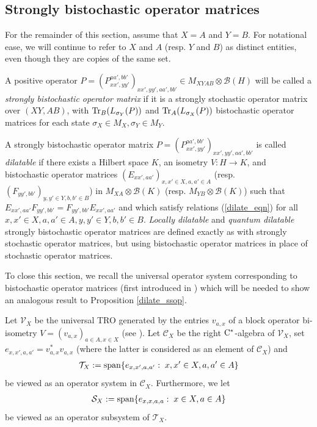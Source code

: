 \documentclass[11pt]{amsart}
\newcommand{\cl}[1]{\mathcal{#1}}
\begin{document}
\subsection{Strongly bistochastic operator matrices}

For the remainder of this section, assume that $X = A$ and $Y = B$. For notational ease, we will continue to refer to $X$ and $A$ (resp. $Y$ and $B$) as distinct entities, even though they are copies of the same set. 

A positive operator $P = (P_{xx', yy'}^{aa', bb'})_{xx', yy', aa', bb'} \in M_{XYAB}\otimes \cl{B}(H)$ will be called a \textit{strongly bistochastic operator matrix} if it is a strongly stochastic operator matrix over $(XY, AB)$, with ${\rm Tr}_{B}(L_{\sigma_{Y}}(P))$ and ${\rm Tr}_{A}(L_{\sigma_{X}}(P))$ bistochastic operator matrices for each state $\sigma_{X} \in M_{X}, \sigma_{Y} \in M_{Y}$. 

A strongly bistochastic operator matrix $P = (P_{xx', yy'}^{aa', bb'})_{xx', yy', aa', bb'}$ is called \textit{dilatable} if there exists a Hilbert space $K$, an isometry $V: H\rightarrow K$, and bistochastic operator matrices $(E_{xx', aa'})_{x, x' \in X, a, a' \in A}$ (resp. $(F_{yy', bb'})_{y, y' \in Y, b, b' \in B}$) in $M_{XA}\otimes \cl{B}(K)$ (resp. $M_{YB}\otimes \cl{B}(K)$) such that $E_{xx', aa'}F_{yy', bb'} = F_{yy', bb'}E_{xx', aa'}$ and which satisfy relations (\ref{dilate_eqn}) for all $x, x' \in X, a, a' \in A, y, y' \in Y, b, b' \in B$. \textit{Locally dilatable} and \textit{quantum dilatable} strongly bistochastic operator matrices are defined exactly as with strongly stochastic operator matrices, but using bistochastic operator matrices in place of stochastic operator matrices. 

To close this section, we recall the universal operator system corresponding to bistochastic operator matrices (first introduced in \cite[Section 3]{bhtt}) which will be needed to show an analogous result to Proposition \ref{dilate_ssop}.

Let $\cl{V}_{X}$ be the universal TRO generated by the entries $v_{a, x}$ of a block operator bi-isometry $V = (v_{a, x})_{a \in A, x \in X}$ (see \cite{bhtt}). Let $\cl{C}_{X}$ be the right ${\rm C}^{*}$-algebra of $\cl{V}_{X}$, set $e_{x, x', a, a'} = v_{a, x}^{*}v_{a, x}$ (where the latter is considered as an element of $\cl{C}_{X}$) and 
\begin{gather*}
	\cl{T}_{X} := {\rm span}\{e_{x, x', a, a'}: \; x, x' \in X, a, a' \in A\}
\end{gather*}
\noindent be viewed as an operator system in $\cl{C}_{X}$. Furthermore, we let
\begin{gather*}
	\cl{S}_{X} := {\rm span}\{e_{x, x, a, a}: \; x \in X, a \in A\}
\end{gather*}
\noindent be viewed as an operator subsystem of $\cl{T}_{X}$.
\end{document}
